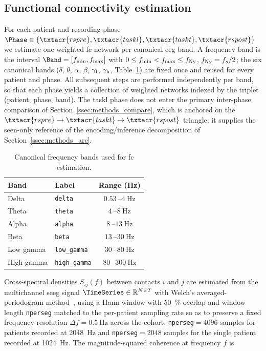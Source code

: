 \subsection{Functional connectivity estimation}
    \label{ssec:methods_fc}
%
For each patient and recording phase \(\Phase \in \{\txtacr{rspre}, \txtacr{taskl}, \txtacr{taskt}, \txtacr{rspost}\}\) we estimate one weighted \gls{fc} network per canonical \gls{eeg} band. A frequency band is the interval \(\Band = [f_{\min}, f_{\max}]\) with \(0 \le f_{\min} < f_{\max} \le f_{\rm Ny}\), \(f_{\rm Ny} = f_s/2\); the six canonical bands (\(\delta\), \(\theta\), \(\alpha\), \(\beta\), \(\gamma_{\rm l}\), \(\gamma_{\rm h}\), Table~\ref{tab:frequency-bands}) are fixed once and reused for every patient and phase. All subsequent steps are performed independently per band, so that each phase yields a collection of weighted networks indexed by the triplet (patient, phase, band). The \acrshort{taskl} phase does not enter the primary inter-phase comparison of Section~\ref{ssec:methods_compare}, which is anchored on the \(\txtacr{rspre} \to \txtacr{taskt} \to \txtacr{rspost}\) triangle; it supplies the seen-only reference of the encoding/inference decomposition of Section~\ref{ssec:methods_arc}.\par
%
\begin{table}[!h]
    \centering
    \begin{tabularx}{\textwidth}{ X X c }
        \hline\hline
        \textbf{Band} & \textbf{Label} & \textbf{Range (Hz)}\\
        \hline
        Delta & \texttt{delta} & \(\qty{0.53}{}\)--\(\qty{4}{\hertz}\)\\
        Theta & \texttt{theta} & \(\qty{4}{}\)--\(\qty{8}{\hertz}\)\\
        Alpha & \texttt{alpha} & \(\qty{8}{}\)--\(\qty{13}{\hertz}\)\\
        Beta & \texttt{beta} & \(\qty{13}{}\)--\(\qty{30}{\hertz}\)\\
        Low gamma & \texttt{low\_gamma} & \(\qty{30}{}\)--\(\qty{80}{\hertz}\)\\
        High gamma & \texttt{high\_gamma} & \(\qty{80}{}\)--\(\qty{300}{\hertz}\)\\
        \hline\hline
    \end{tabularx}
    \caption{Canonical frequency bands used for \gls{fc} estimation.}
        \label{tab:frequency-bands}
\end{table}
%
Cross-spectral densities \(S_{ij}(f)\) between contacts \(i\) and \(j\) are estimated from the multichannel \gls{seeg} signal \(\TimeSeries \in \mathbb{R}^{N \times T}\) with Welch's averaged-periodogram method~\cite{welch1967use}, using a Hann window with \qty{50}{\percent} overlap and window length \texttt{nperseg} matched to the per-patient sampling rate so as to preserve a fixed frequency resolution \(\Delta f = \qty{0.5}{\hertz}\) across the cohort: \texttt{nperseg}\(= 4096\) samples for patients recorded at \qty{2048}{\hertz} and \texttt{nperseg}\(= 2048\) samples for the single patient recorded at \qty{1024}{\hertz}. The magnitude-squared coherence at frequency \(f\) is
